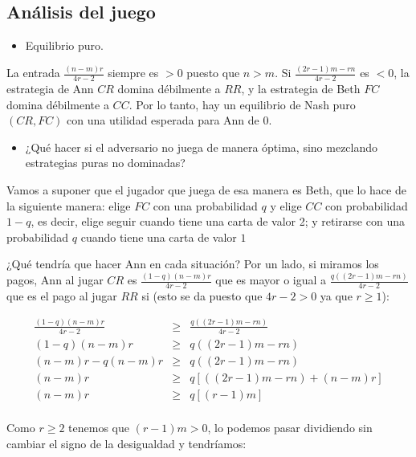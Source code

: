 \documentclass[12pt,a4paper,]{book}
\providecommand{\tightlist}{%
  \setlength{\itemsep}{0pt}\setlength{\parskip}{0pt}}
\numberwithin{dummy}{section}
\theoremstyle{ocrenumbox}
\theoremstyle{blacknumex}
\theoremstyle{blacknumbox}
\theoremstyle{ocrenum}
\theoremstyle{ocrenum}
\begin{document}
\hypertarget{Seccion512}{%
\subsection{Análisis del juego}\label{Seccion512}}

\begin{itemize}
\tightlist
\item
  Equilibrio puro.
\end{itemize}

La entrada \(\frac{(n-m)r}{4r-2}\) siempre es \(>0\) puesto que \(n>m\).
Si \(\frac{(2r-1)m-rn}{4r-2}\) es \(<0\), la estrategia de Ann \(CR\)
domina débilmente a \(RR\), y la estrategia de Beth \(FC\) domina
débilmente a \(CC\). Por lo tanto, hay un equilibrio de Nash puro
\((CR,FC)\) con una utilidad esperada para Ann de \(0\).

\begin{itemize}
\tightlist
\item
  ¿Qué hacer si el adversario no juega de manera óptima, sino mezclando
  estrategias puras no dominadas?
\end{itemize}

Vamos a suponer que el jugador que juega de esa manera es Beth, que lo
hace de la siguiente manera: elige \(FC\) con una probabilidad \(q\) y
elige \(CC\) con probabilidad \(1-q\), es decir, elige seguir cuando
tiene una carta de valor 2; y retirarse con una probabilidad \(q\)
cuando tiene una carta de valor \(1\)

¿Qué tendría que hacer Ann en cada situación? Por un lado, si miramos
los pagos, Ann al jugar \(CR\) es \(\frac{(1-q)(n-m)r}{4r-2}\) que es
mayor o igual a \(\frac{q((2r-1)m-rn)}{4r-2}\) que es el pago al jugar
\(RR\) si (esto se da puesto que \(4r-2>0\) ya que \(r \geq 1\)):

\[
\begin{array}{rcl}
\frac{(1-q)(n-m)r}{4r-2} & \geq &\frac{q((2r-1)m-rn)}{4r-2}\\
(1-q)(n-m)r & \geq & q((2r-1)m-rn) \\
(n-m)r -q(n-m)r & \geq & q((2r-1)m-rn)\\
(n-m)r & \geq & q[((2r-1)m-rn)+(n-m)r]\\
(n-m)r & \geq & q[(r-1)m]\\
\end{array}
\]

Como \(r \geq 2\) tenemos que \((r-1)m >0\), lo podemos pasar dividiendo
sin cambiar el signo de la desigualdad y tendríamos:
\end{document}
